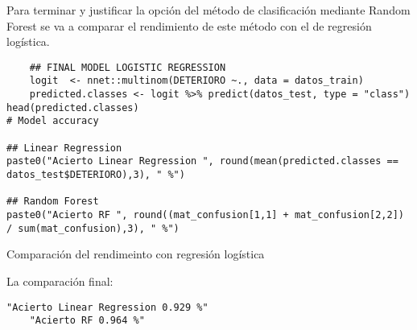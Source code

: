Para terminar y justificar la opción del método de clasificación mediante Random Forest se va a comparar el rendimiento de este método con el de regresión logística.
\begin{code}[H]
\begin{lstlisting}
    ## FINAL MODEL LOGISTIC REGRESSION
    logit  <- nnet::multinom(DETERIORO ~., data = datos_train)
    predicted.classes <- logit %>% predict(datos_test, type = "class")
head(predicted.classes)
# Model accuracy

## Linear Regression
paste0("Acierto Linear Regression ", round(mean(predicted.classes == datos_test$DETERIORO),3), " %")

## Random Forest
paste0("Acierto RF ", round((mat_confusion[1,1] + mat_confusion[2,2]) / sum(mat_confusion),3), " %")
\end{lstlisting}
\caption{Comparación del rendimeinto con regresión logística}
\label{code:Comparación del rendimeinto con regresión logística}
\end{code}

La comparación final: 

\begin{lstlisting}[style=mystyle]
    "Acierto Linear Regression 0.929 %"
    "Acierto RF 0.964 %"
\end{lstlisting}



